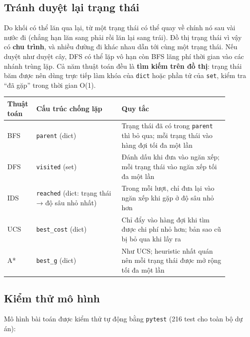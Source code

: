\subsection{Tránh duyệt lại trạng thái}

Do khối có thể lăn qua lại, từ một trạng thái có thể quay về chính nó sau vài nước đi (chẳng hạn lăn sang phải rồi lăn lại sang trái). Đồ thị trạng thái vì vậy có \textbf{chu trình}, và nhiều đường đi khác nhau dẫn tới cùng một trạng thái. Nếu duyệt như duyệt cây, DFS có thể lặp vô hạn còn BFS lãng phí thời gian vào các nhánh trùng lặp. Cả năm thuật toán đều là \textbf{tìm kiếm trên đồ thị}: trạng thái băm được nên dùng trực tiếp làm khóa của \texttt{dict} hoặc phần tử của \texttt{set}, kiểm tra ``đã gặp'' trong thời gian O(1).

{\renewcommand{\arraystretch}{1.25}
\begin{longtable}{|>{\raggedright\arraybackslash}p{0.082\linewidth}|>{\raggedright\arraybackslash}p{0.361\linewidth}|>{\raggedright\arraybackslash}p{0.452\linewidth}|}
\hline
\textbf{Thuật toán} & \textbf{Cấu trúc chống lặp} & \textbf{Quy tắc} \\ \hline
\endhead
\hline
\endlastfoot
BFS & \texttt{parent} (dict) & Trạng thái đã có trong \texttt{parent} thì bỏ qua; mỗi trạng thái vào hàng đợi tối đa một lần \\ \hline
DFS & \texttt{visited} (set) & Đánh dấu khi đưa vào ngăn xếp; mỗi trạng thái vào ngăn xếp tối đa một lần \\ \hline
IDS & \texttt{reached} (dict: trạng thái → độ sâu nhỏ nhất) & Trong mỗi lượt, chỉ đưa lại vào ngăn xếp khi gặp ở độ sâu nhỏ hơn \\ \hline
UCS & \texttt{best\_\allowbreak{}cost} (dict) & Chỉ đẩy vào hàng đợi khi tìm được chi phí nhỏ hơn; bản sao cũ bị bỏ qua khi lấy ra \\ \hline
A* & \texttt{best\_\allowbreak{}g} (dict) & Như UCS; heuristic nhất quán nên mỗi trạng thái được mở rộng tối đa một lần \\
\end{longtable}
}

\subsection{Kiểm thử mô hình}

Mô hình bài toán được kiểm thử tự động bằng \texttt{pytest} (216 test cho toàn bộ dự án):

